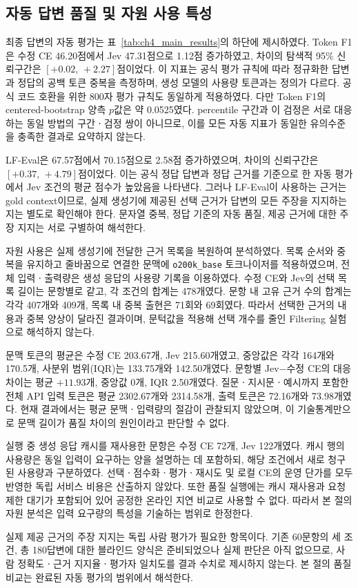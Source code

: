 \subsection{자동 답변 품질 및 자원 사용 특성}
\label{sec:ch4_answer_resources}

최종 답변의 자동 평가는 표~\ref{tab:ch4_main_results}의 하단에 제시하였다.
Token F1은 수정 CE 46.20점에서 Jev 47.31점으로 1.12점 증가하였고,
차이의 탐색적 95\% 신뢰구간은 $[+0.02,\,+2.27]$점이었다.
이 지표는 공식 평가 규칙에 따라 정규화한 답변과 정답의 공백 토큰
중복을 측정하며, 생성 모델의 사용량 토큰과는 정의가 다르다.
공식 코드 호환을 위한 800자 평가 규칙도 동일하게 적용하였다.
다만 Token F1의 centered-bootstrap 양측 $p$값은 약 0.0525였다.
percentile 구간과 이 검정은 서로 대응하는 동일 방법의 구간ㆍ검정
쌍이 아니므로, 이를 모든 자동 지표가 동일한 유의수준을 충족한
결과로 요약하지 않는다.

LF-Eval은 67.57점에서 70.15점으로 2.58점 증가하였으며,
차이의 신뢰구간은 $[+0.37,\,+4.79]$점이었다.
이는 공식 정답 답변과 정답 근거를 기준으로 한 자동 평가에서
Jev 조건의 평균 점수가 높았음을 나타낸다.
그러나 LF-Eval이 사용하는 근거는 gold context이므로,
실제 생성기에 제공된 선택 근거가 답변의 모든 주장을 지지하는지는
별도로 확인해야 한다. 문자열 중복, 정답 기준의 자동 품질,
제공 근거에 대한 주장 지지는 서로 구별하여 해석한다.

자원 사용은 실제 생성기에 전달한 근거 목록을 복원하여 분석하였다.
목록 순서와 중복을 유지하고 줄바꿈으로 연결한 문맥에
\texttt{o200k\_base} 토크나이저를 적용하였으며,
전체 입력ㆍ출력량은 생성 응답의 사용량 기록을 이용하였다.
수정 CE와 Jev의 선택 목록 길이는 문항별로 같고, 각 조건의 합계는
478개였다. 문항 내 고유 근거 수의 합계는 각각 407개와 409개,
목록 내 중복 출현은 71회와 69회였다. 따라서 선택한 근거의 내용과
중복 양상이 달라진 결과이며, 문턱값을 적용해 선택 개수를 줄인
Filtering 실험으로 해석하지 않는다.

문맥 토큰의 평균은 수정 CE 203.67개, Jev 215.60개였고,
중앙값은 각각 164개와 170.5개, 사분위 범위(IQR)는
133.75개와 142.50개였다. 문항별 Jev$-$수정 CE의 대응 차이는
평균 $+11.93$개, 중앙값 0개, IQR 2.50개였다.
질문ㆍ지시문ㆍ예시까지 포함한 전체 API 입력 토큰은 평균
2302.67개와 2314.58개, 출력 토큰은 72.16개와 73.98개였다.
현재 결과에서는 평균 문맥ㆍ입력량의 절감이 관찰되지 않았으며,
이 기술통계만으로 문맥 길이가 품질 차이의 원인이라고 판단할 수 없다.

실행 중 생성 응답 캐시를 재사용한 문항은 수정 CE 72개, Jev 122개였다.
캐시 행의 사용량은 동일 입력이 요구하는 양을 설명하는 데 포함하되,
해당 조건에서 새로 청구된 사용량과 구분하였다.
선택ㆍ점수화ㆍ평가ㆍ재시도 및 로컬 CE의 운영 단가를 모두 반영한
독립 서비스 비용은 산출하지 않았다. 또한 품질 실행에는 캐시 재사용과
요청 제한 대기가 포함되어 있어 공정한 온라인 지연 비교로 사용할 수 없다.
따라서 본 절의 자원 분석은 입력 요구량의 특성을 기술하는 범위로 한정한다.

실제 제공 근거의 주장 지지는 독립 사람 평가가 필요한 항목이다.
기존 60문항의 세 조건, 총 180답변에 대한 블라인드 양식은 준비되었으나
실제 판단은 아직 없으므로, 사람 정확도ㆍ근거 지지율ㆍ평가자 일치도를
결과 수치로 제시하지 않는다. 본 절의 품질 비교는 완료된 자동 평가의
범위에서 해석한다.
